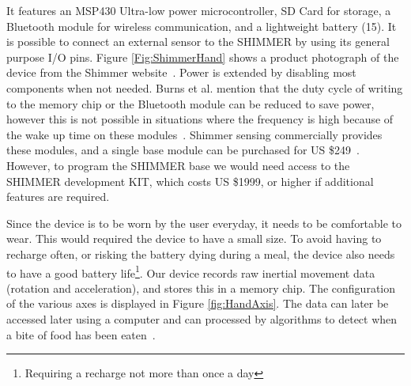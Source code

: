 It features an MSP430 Ultra-low power microcontroller,
SD Card for storage,
a Bluetooth module for wireless communication,
and a lightweight battery (15).
It is possible to connect an external sensor to the SHIMMER by using its general purpose I/O pins.
Figure \ref{Fig:ShimmerHand} shows a product photograph of the device from the Shimmer website~\cite{Web:ShimmerBuyKit}.
Power is extended by disabling most components when not needed.
Burns et al. mention that the duty cycle of writing to the memory chip or the Bluetooth module can be reduced to save power,
however this is not possible in situations where the frequency is high because of the wake up time on these modules~\cite{burns2010shimmer}.
Shimmer sensing commercially provides these modules,
and a single base module can be purchased for US \$249~\cite{Web:ShimmerBuy}.
However, to program the SHIMMER base we would need access to the SHIMMER development KIT,
which costs US \$1999, or higher if additional features are required.



Since the device is to be worn by the user everyday, it needs to be comfortable to wear.
This would required the device to have a small size.
To avoid having to recharge often, or risking the battery dying during a meal,
the device also needs to have a good battery life\footnote{Requiring a recharge not more than once a day}.
Our device records raw inertial movement data (rotation and acceleration), and stores this in a memory chip.
The configuration of the various axes is displayed in Figure \ref{fig:HandAxis}.
The data can later be accessed later using a computer and can processed by algorithms
to detect when a bite of food has been eaten~\cite{dong2012new}.